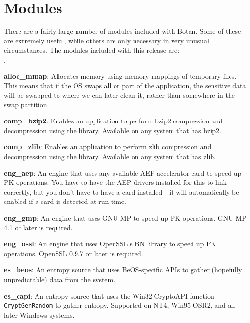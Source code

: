 \documentclass{article}
\begin{document}
\pagebreak

\section{Modules}

There are a fairly large number of modules included with Botan. Some
of these are extremely useful, while others are only necessary in very
unusual circumstances. The modules included with this release are:

\newcommand{\mod}[2]{\textbf{#1}: #2}

\begin{list}{$\cdot$}
  \item \mod{alloc\_mmap}{Allocates memory using memory mappings of temporary
         files. This means that if the OS swaps all or part of the application,
         the sensitive data will be swapped to where we can later clean it,
         rather than somewhere in the swap partition.}

  \item \mod{comp\_bzip2}{Enables an application to perform bzip2 compression
         and decompression using the library. Available on any system that has
         bzip2.}

  \item \mod{comp\_zlib}{Enables an application to perform zlib compression and
         decompression using the library. Available on any system that has
         zlib.}

  \item \mod{eng\_aep}{An engine that uses any available AEP accelerator card
         to speed up PK operations. You have to have the AEP drivers installed
         for this to link correctly, but you don't have to have a card
         installed - it will automatically be enabled if a card is detected at
         run time.}

  \item \mod{eng\_gmp}{An engine that uses GNU MP to speed up PK operations.
         GNU MP 4.1 or later is required.}

  \item \mod{eng\_ossl}{An engine that uses OpenSSL's BN library to speed up PK
         operations. OpenSSL 0.9.7 or later is required.}

  \item \mod{es\_beos}{An entropy source that uses BeOS-specific APIs to gather
         (hopefully unpredictable) data from the system.}

  \item \mod{es\_capi}{An entropy source that uses the Win32 CryptoAPI function
         \texttt{CryptGenRandom} to gather entropy. Supported on NT4, Win95
         OSR2, and all later Windows systems.}


\end{list}
\end{document}
